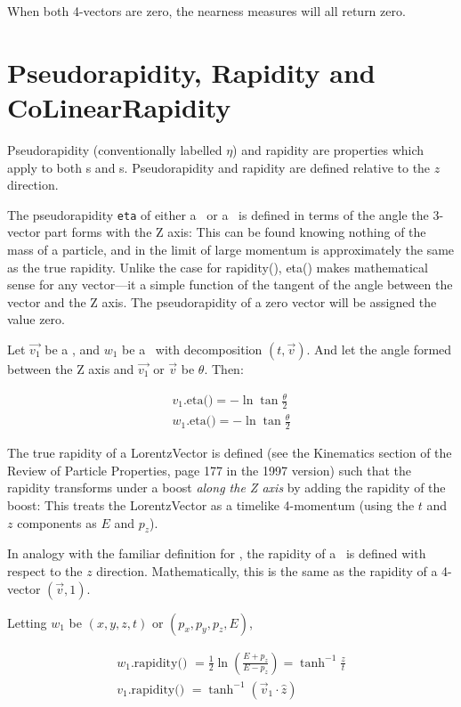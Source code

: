 When both 4-vectors are zero, the nearness measures will all return zero.

\section {Pseudorapidity, Rapidity and CoLinearRapidity}
\label{rapidity}

\noindent
Pseudorapidity (conventionally labelled $\eta$) and rapidity are properties
which apply to both \SV s and \LV s.
Pseudorapidity and rapidity are defined relative to the $z$ direction.

The pseudorapidity {\tt eta} of either a \LV\ or a \SV\ is defined in terms of
the angle the 3-vector part forms with the Z axis:
This can be found knowing nothing of the mass of a particle, and
in the limit of large momentum is approximately the same as the true rapidity.
Unlike the case for rapidity(), eta() makes mathematical sense for any
vector---it a simple function of the tangent of the angle between the vector and
the Z axis.
The pseudorapidity of a zero vector will be assigned the value zero.

Let $\vec{v_1}$ be a \SV, and $w_1$ be a \LV\ with decomposition
$(t, \vec{v})$.
And let the angle formed between the Z axis and
$\vec{v_1}$ or $\vec{v}$ be $\theta$.  Then:

\begin{eqnarray}
\label{eq:eta:3}
  v_1 \mbox{.eta()} = - \ln \tan \frac{\theta}{2} \\
\label{eq:weta:3}
  w_1 \mbox{.eta()} = - \ln \tan \frac{\theta}{2}
\end{eqnarray}


\noindent
The true rapidity of a LorentzVector is defined (see the Kinematics section of
the Review of Particle Properties, page 177 in the 1997 version) such that
the rapidity transforms under a boost {\em along the Z axis}
by adding the rapidity of the boost:
This treats the LorentzVector as a timelike 4-momentum
(using the $t$ and $z$ components as $E$ and $p_z$).

In analogy with the familiar definition for \LV, the rapidity of a \SV\ is
defined with respect to the $z$ direction.
Mathematically, this is the same as the rapidity of a 4-vector
$(\vec{v}, 1)$.

Letting $w_1$ be $(x, y, z, t)$ or $(p_x, p_y, p_z, E)$,

\begin{eqnarray}
\label{eq:wrapid:3}
  w_1 \mbox{.rapidity() }
	= \frac{1}{2} \ln \left( \frac{E + p_z}{E - p_z}    \right)
	= \tanh^{-1} \frac {z}{t} \\
  v_1 \mbox{.rapidity() }
	= \tanh^{-1} (\vec{v}_1 \cdot \hat{z})
\end{eqnarray}


